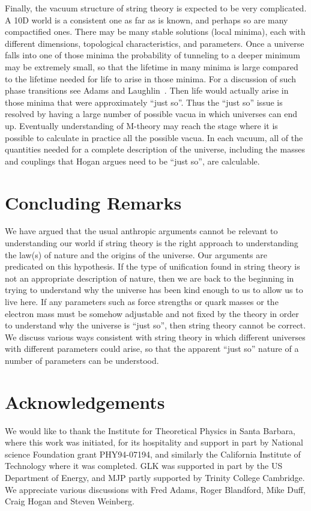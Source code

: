 \documentclass{article}
\begin{document}
Finally, the vacuum structure of string theory is expected to be very
complicated. A
10D world is a consistent one as far as is known, and perhaps so are
many compactified ones.  There may be many stable solutions (local minima), 
each with
different dimensions, topological characteristics, and parameters.  Once
a universe falls into one of those minima the probability of tunneling
to a deeper minimum may be extremely small, so that the lifetime in many
minima is large compared to the lifetime needed for life to arise in
those minima. For a discussion of such phase transitions see Adams and
Laughlin~\cite{AL:paper}.
Then life would actually arise in those minima that were
approximately ``just so''.  Thus the ``just so'' issue is resolved by
having a large number of possible vacua in which universes can end up.
Eventually understanding of M-theory may reach the stage where it is
possible to calculate in practice all the possible vacua.  In each
vacuum, all of the quantities needed for a complete description of the
universe, including the masses and couplings that Hogan argues need to
be ``just so'', are calculable.


\section{Concluding Remarks}

We have argued that the usual anthropic arguments cannot be relevant
to understanding our world if string theory is the right approach to
understanding the law(s) of nature and the origins of the universe.
Our arguments are predicated on this hypothesis. If the type of unification
found in string theory is not an appropriate description of nature, then
we are back to the beginning in trying to understand why the universe has been
kind enough to us to allow us to live here.
If any parameters such as force strengths or quark masses
or the electron mass must be somehow adjustable and not fixed by the
theory in order to understand why the universe is ``just so'', then
string theory cannot be correct. We discuss various ways consistent
with string theory in which different universes with different
parameters could arise, so that the apparent ``just so'' nature of a
number of parameters can be understood.

\section{Acknowledgements}

We would like to thank the Institute for Theoretical Physics in Santa
Barbara, where this work was initiated, for its hospitality and support
in part by National science Foundation grant PHY94-07194,
and similarly the California Institute of Technology where it was completed.
GLK was supported in part by the US Department of Energy, and MJP 
partly supported by Trinity College Cambridge. We appreciate various
discussions with Fred Adams, Roger Blandford, Mike Duff, Craig Hogan
and Steven Weinberg. 
\end{document}
